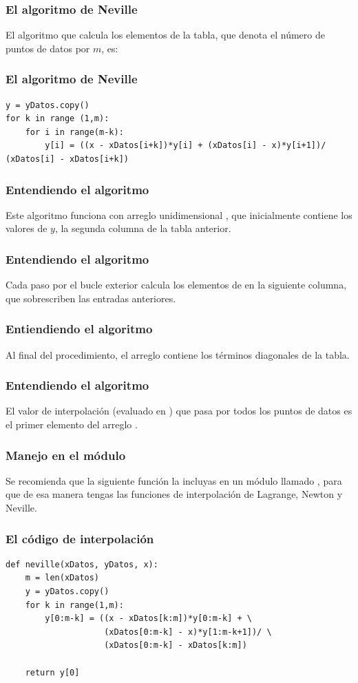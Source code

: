 \documentclass[12pt]{beamer}
\begin{document}
\begin{frame}
\frametitle{El algoritmo de Neville}
El algoritmo que calcula los elementos de la tabla, que denota el número de puntos de datos por $m$, es:
\end{frame}
\begin{frame}[fragile]
\frametitle{El algoritmo de Neville}
\begin{lstlisting}[caption=Algoritmo de Neville]
y = yDatos.copy()
for k in range (1,m):
	for i in range(m-k):
		y[i] = ((x - xDatos[i+k])*y[i] + (xDatos[i] - x)*y[i+1])/ (xDatos[i] - xDatos[i+k])
\end{lstlisting}
\end{frame}
\begin{frame}
\frametitle{Entendiendo el algoritmo}
Este algoritmo funciona con arreglo unidimensional , que inicialmente contiene los valores de $y$, la segunda columna de la tabla anterior.
\end{frame}
\begin{frame}
\frametitle{Entendiendo el algoritmo}
Cada paso por el bucle exterior calcula los elementos de  en la siguiente columna, \pause que sobrescriben las entradas anteriores.
\end{frame}
\begin{frame}
\frametitle{Entiendiendo el algoritmo}
Al final del procedimiento, el arreglo  contiene los términos diagonales de la tabla.
\end{frame}
\begin{frame}
\frametitle{Entendiendo el algoritmo}
El valor de interpolación (evaluado en ) que pasa por todos los puntos de datos es el primer elemento del arreglo .
\end{frame}
\begin{frame}
\frametitle{Manejo en el módulo}
Se recomienda que la siguiente función la incluyas en un módulo llamado , \pause para que de esa manera tengas las funciones de interpolación de Lagrange, Newton y Neville.
\end{frame}
\begin{frame}[fragile]
\frametitle{El código de interpolación}
\begin{lstlisting}[caption=La función interpolación de Neville]
def neville(xDatos, yDatos, x):
	m = len(xDatos)
	y = yDatos.copy()
	for k in range(1,m):
		y[0:m-k] = ((x - xDatos[k:m])*y[0:m-k] + \
					(xDatos[0:m-k] - x)*y[1:m-k+1])/ \
					(xDatos[0:m-k] - xDatos[k:m])

	return y[0]
\end{lstlisting}
\end{frame}
\end{document}

